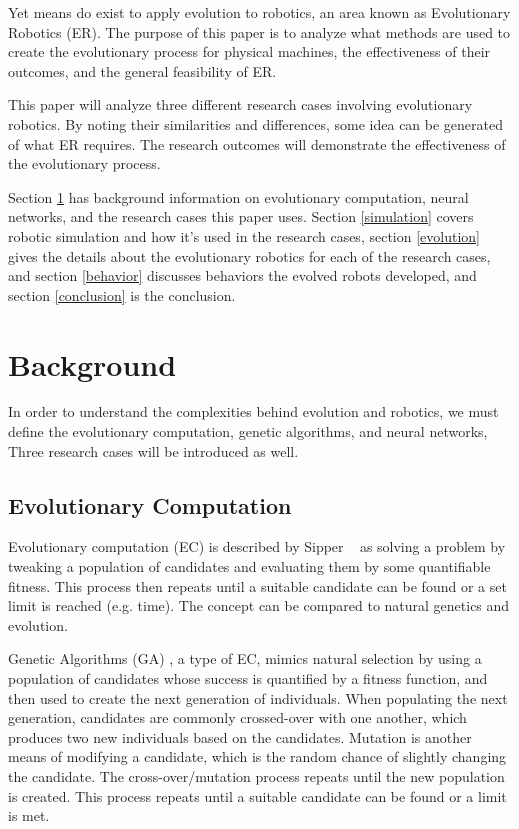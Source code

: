 \documentclass{sig-alternate}
\begin{document}
 Yet means do exist to apply evolution to robotics, an area known as Evolutionary Robotics (ER). The purpose of this paper is to analyze what methods are used to create the evolutionary process for physical machines, the effectiveness of their outcomes, and the general feasibility of ER.
 
 This paper will analyze three different research cases involving evolutionary robotics. By noting their similarities and differences, some idea can be generated of what ER requires. The research outcomes will demonstrate the effectiveness of the evolutionary process.

   Section \ref{background}  has  background information on evolutionary computation, neural networks, and the research cases this paper uses. Section \ref{simulation} covers robotic simulation and how it's used in the research cases, section \ref{evolution} gives the details about the evolutionary robotics for each of the research cases, and section \ref{behavior} discusses behaviors the evolved robots developed, and section \ref{conclusion} is the conclusion.
 
 
\section{Background}\label{background}
In order to understand the complexities behind evolution and robotics, we must define the evolutionary computation, genetic algorithms, and neural networks, Three research cases will be introduced as well.

 \subsection{Evolutionary Computation}\label{background EC}
  Evolutionary computation (EC) is described by Sipper ~\cite{Sipper2011Win} as solving a problem by tweaking a population of candidates and evaluating them by some quantifiable fitness. This process then repeats until a suitable candidate can be found or a set limit is reached (e.g. time). The concept can be compared to natural genetics and evolution.
  
  Genetic Algorithms (GA) \cite{wiki:GeneticAlgorithms}, a type of EC, mimics natural selection by using a population of candidates whose success is quantified by a fitness function, and then used to create the next generation of individuals. When populating the next generation, candidates are commonly crossed-over with one another, which produces two new individuals based on the candidates. Mutation is another means of modifying a candidate, which is the random chance  of slightly changing the candidate. The cross-over/mutation process repeats until the new population is created. This process  repeats until a suitable candidate can be found or a limit is met.
  
\end{document}
